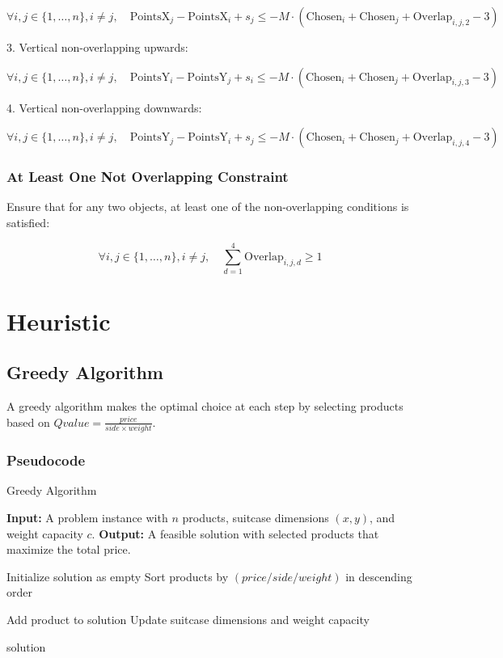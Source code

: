 \documentclass{article}
\begin{document}
\[
\forall i, j \in \{1, \ldots, n\}, i \neq j, \quad \text{PointsX}_j - \text{PointsX}_i + s_j \leq -M \cdot (\text{Chosen}_i + \text{Chosen}_j + \text{Overlap}_{i,j,2} - 3)
\]

3. Vertical non-overlapping upwards:

\[
\forall i, j \in \{1, \ldots, n\}, i \neq j, \quad \text{PointsY}_i - \text{PointsY}_j + s_i \leq -M \cdot (\text{Chosen}_i + \text{Chosen}_j + \text{Overlap}_{i,j,3} - 3)
\]

4. Vertical non-overlapping downwards:

\[
\forall i, j \in \{1, \ldots, n\}, i \neq j, \quad \text{PointsY}_j - \text{PointsY}_i + s_j \leq -M \cdot (\text{Chosen}_i + \text{Chosen}_j + \text{Overlap}_{i,j,4} - 3)
\]

\subsubsection{At Least One Not Overlapping Constraint}

Ensure that for any two objects, at least one of the non-overlapping conditions is satisfied:

\[
\forall i, j \in \{1, \ldots, n\}, i \neq j, \quad \sum_{d=1}^4 \text{Overlap}_{i,j,d} \geq 1
\]

\newpage

\section{Heuristic}

\subsection{Greedy Algorithm}
A greedy algorithm makes the optimal choice at each step by selecting products based on $Qvalue = \frac{price}{side \times weight}$.

\subsubsection{Pseudocode}
\begin{algorithm}
\caption{Greedy Algorithm}
\begin{algorithmic}
    \State \textbf{Input:} A problem instance with $n$ products, suitcase dimensions $(x, y)$, and weight capacity $c$.
    \State \textbf{Output:} A feasible solution with selected products that maximize the total price.    

    \State Initialize solution as empty
    \State Sort products by $(price / side / weight)$ in descending order

            \State Add product to solution
            \State Update suitcase dimensions and weight capacity
        \EndIf
    \EndFor

    \State \Return solution
\end{algorithmic}
\end{algorithm}
\end{document}
